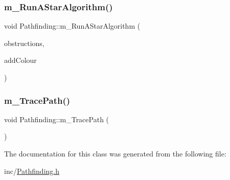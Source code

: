 \mbox{\label{class_pathfinding_a0dcc4744c8892ca16c6f685f8c534645}} 
\subsubsection{\texorpdfstring{m\+\_\+\+Run\+A\+Star\+Algorithm()}{m\_RunAStarAlgorithm()}\hspace{0.1cm}{\footnotesize\ttfamily [3/3]}}
{\footnotesize\ttfamily void Pathfinding\+::m\+\_\+\+Run\+A\+Star\+Algorithm (\begin{DoxyParamCaption}\item[{std\+::vector$<$ \mbox{\hyperlink{_cells_8h_adc5e4636eae42cdad2a070c6adbd9daf}{tile\+Set}} $>$}]{obstructions,  }\item[{bool}]{add\+Colour }\end{DoxyParamCaption})}

\mbox{\label{class_pathfinding_abca4c4bbc051a99323d29106127fb389}} 
\subsubsection{\texorpdfstring{m\+\_\+\+Trace\+Path()}{m\_TracePath()}}
{\footnotesize\ttfamily void Pathfinding\+::m\+\_\+\+Trace\+Path (\begin{DoxyParamCaption}{ }\end{DoxyParamCaption})}



The documentation for this class was generated from the following file\+:\begin{DoxyCompactItemize}
\item 
inc/\mbox{\hyperlink{_pathfinding_8h}{Pathfinding.\+h}}\end{DoxyCompactItemize}
